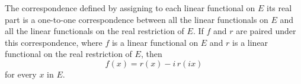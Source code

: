 The correspondence defined by assigning to each linear functional on $E$ its real part is a one-to-one correspondence between all the linear functionals on $E$ and all the linear functionals on the real restriction of $E$. If $f$ and $r$ are paired under this correspondence, where $f$ is a linear functional on $E$ and $r$ is a linear functional on the real restriction of $E$, then
$$
f(x) = r(x) - i\, r(ix)
$$
for every $x$ in $E$.

